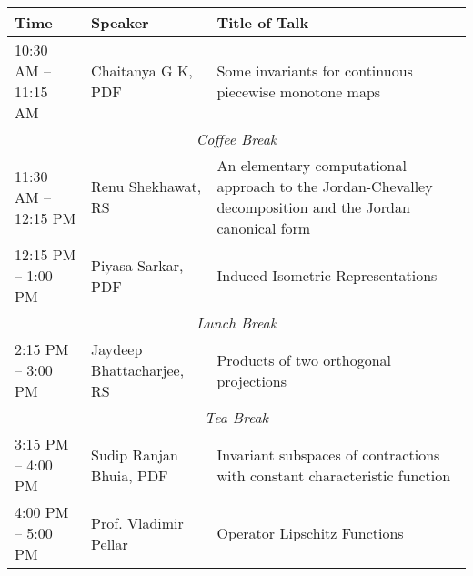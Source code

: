 \noindent
\renewcommand{\arraystretch}{1.5} %
\begin{tabular}{|p{3.5cm}|p{4cm}|p{7cm}|}
	\hline
	\textbf{Time} & \textbf{Speaker} & \textbf{Title of Talk} \\
	\hline
	10:30 AM -- 11:15 AM & Chaitanya G K, PDF & Some invariants for continuous piecewise monotone maps \\
	\hline
	\multicolumn{3}{|c|}{\textit{Coffee Break}} \\
	\hline
	11:30 AM -- 12:15 PM & Renu Shekhawat, RS & An elementary computational approach to the Jordan-Chevalley decomposition and the Jordan canonical form \\
	\hline
	12:15 PM -- 1:00 PM & Piyasa Sarkar, PDF & Induced Isometric Representations \\
	\hline
	\multicolumn{3}{|c|}{\textit{Lunch Break}} \\
	\hline
	2:15 PM -- 3:00 PM & Jaydeep Bhattacharjee, RS& Products of two orthogonal projections\\
	\hline
	\multicolumn{3}{|c|}{\textit{Tea Break}} \\
	\hline

	3:15 PM -- 4:00 PM & Sudip Ranjan Bhuia, PDF & Invariant subspaces of contractions with constant characteristic function \\
	\hline

    4:00 PM -- 5:00 PM & Prof. Vladimir Pellar & Operator Lipschitz Functions \\
    \hline
\end{tabular}
